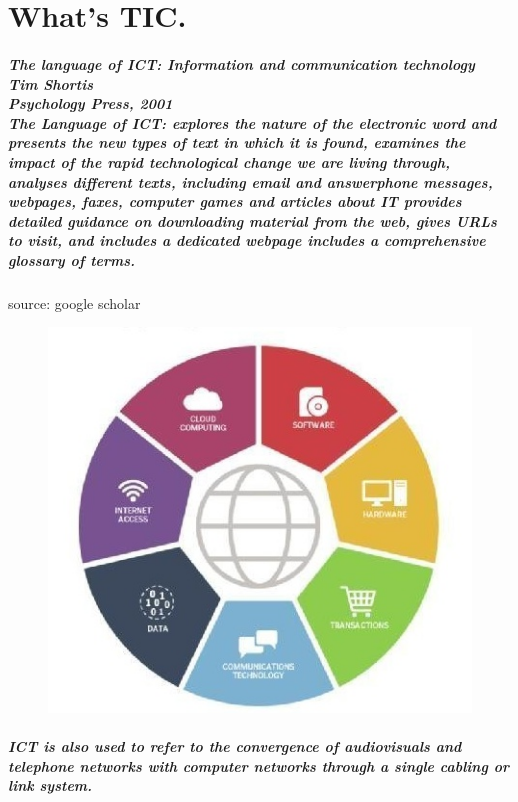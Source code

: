 \documentclass[a4paper,11pt]{report}
\begin{document}
\chapter{What's TIC.}


\paragraph{The language of ICT: Information and communication technology\\
\textit{Tim Shortis}\\
Psychology Press, 2001\\
The Language of \textbf{ICT}: explores the nature of the electronic word and presents the new types of text in which it is found, examines the impact of the rapid technological change we are living through, analyses different texts, including email and answerphone messages, webpages, faxes, computer games and articles about \textbf{IT} provides detailed guidance on downloading material from the web, gives URLs to visit, and includes a dedicated webpage includes a comprehensive glossary of terms.} source: google scholar

\begin{figure} [!h]
\centering
 \includegraphics[scale=0.2]{tic.jpeg}
\end{figure}
\paragraph{ICT is also used to refer to the convergence of audiovisuals and telephone networks with computer networks through a single cabling or link system.}
\end{document}
